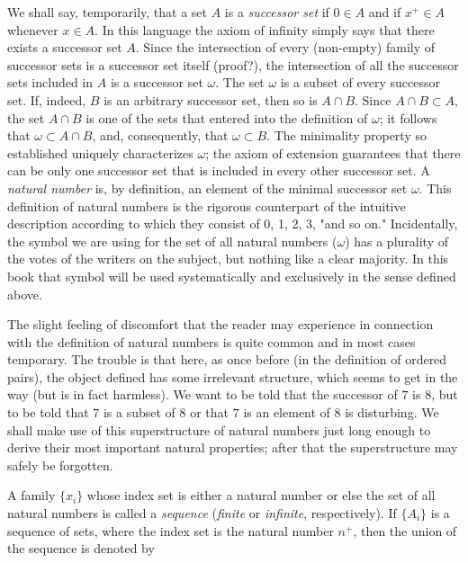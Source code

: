 We shall say, temporarily, that a set $A$ is a \textit{successor set} if $0 \in A$ and if $x^{+} \in A$ whenever $x \in A$. In this language the axiom of infinity simply says that there exists a successor set $A$. Since the intersection of every (non-empty) family of successor sets is a successor set itself (proof?), the intersection of all the successor sets included in $A$ is a successor set $ \omega $. The set $ \omega $ is a subset of every successor set. If, indeed, $B$ is an arbitrary successor set, then so is $A \cap B$. Since $ A \cap B \subset A$, the set $A \cap B$ is one of the sets that entered into the definition of $ \omega $; it follows that $ \omega \subset A \cap B$, and, consequently, that $\omega  \subset B$. The minimality property so established uniquely characterizes $ \omega $; the axiom of extension guarantees that there can be only one successor set that is included in every other successor set. A \textit{natural number} is, by definition, an element of the minimal successor set $ \omega$. This definition of natural numbers is the rigorous counterpart of the intuitive description according to which they consist of 0, 1, 2, 3, "and so on." Incidentally, the symbol we are using for the set of all natural numbers ($ \omega $) has a plurality of the votes of the writers on the subject, but nothing like a clear majority. In this book that symbol will be used systematically and exclusively in the sense defined above.

The slight feeling of discomfort that the reader may experience in connection with the definition of natural numbers is quite common and in most cases temporary. The trouble is that here, as once before (in the definition of ordered pairs), the object defined has some irrelevant structure, which seems to get in the way (but is in fact harmless). We want to be told that the successor of $7$ is $8$, but to be told that $7$ is a subset of $8$ or that $7$ is an element of $8$ is disturbing. We shall make use of this superstructure of natural numbers just long enough to derive their most important natural properties; after that the superstructure may safely be forgotten.

A family $ \{ x_{i} \} $ whose index set is either a natural number or else the set of all natural numbers is called a \textit{sequence} (\textit{finite} or \textit{infinite}, respectively). If $\{ A_{i} \}$ is a sequence of sets, where the index set is the natural number $n^{+}$, then the union of the sequence is denoted by

